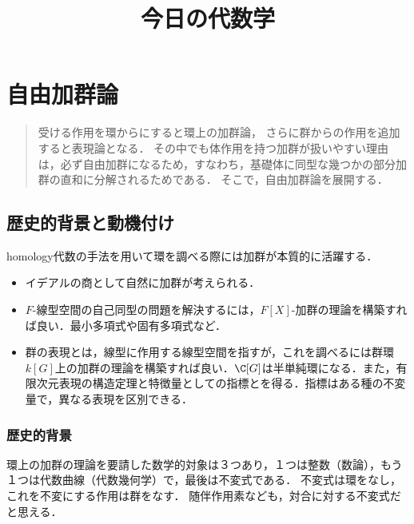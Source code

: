 \documentclass[uplatex,dvipdfmx]{jsreport}
\title{今日の代数学}
\author{}
\begin{document}
\tableofcontents

\chapter{自由加群論}

\begin{quotation}
    受ける作用を環からにすると環上の加群論，
    さらに群からの作用を追加すると表現論となる．
    その中でも体作用を持つ加群が扱いやすい理由は，必ず自由加群になるため，すなわち，基礎体に同型な幾つかの部分加群の直和に分解されるためである．
    そこで，自由加群論を展開する．
\end{quotation}

\section{歴史的背景と動機付け}

\begin{tcolorbox}[colframe=ForestGreen, colback=ForestGreen!10!white,breakable,colbacktitle=ForestGreen!40!white,coltitle=black,fonttitle=\bfseries\sffamily,
    title=]
    homology代数の手法を用いて環を調べる際には加群が本質的に活躍する．
    \begin{itemize}
        \item イデアルの商として自然に加群が考えられる．
        \item $F$-線型空間の自己同型の問題を解決するには，$F[X]$-加群の理論を構築すれば良い．最小多項式や固有多項式など．
        \item 群の表現とは，線型に作用する線型空間を指すが，これを調べるには群環$k[G]$上の加群の理論を構築すれば良い．$\C[G]$は半単純環になる．また，有限次元表現の構造定理と特徴量としての指標とを得る．指標はある種の不変量で，異なる表現を区別できる．
    \end{itemize}
\end{tcolorbox}


\subsection{歴史的背景}

\begin{tcolorbox}[colframe=ForestGreen, colback=ForestGreen!10!white,breakable,colbacktitle=ForestGreen!40!white,coltitle=black,fonttitle=\bfseries\sffamily,
title=]
    環上の加群の理論を要請した数学的対象は３つあり，１つは整数（数論），もう１つは代数曲線（代数幾何学）で，最後は不変式である．
    不変式は環をなし，これを不変にする作用は群をなす．
    随伴作用素なども，対合に対する不変式だと思える．
\end{tcolorbox}
\end{document}
